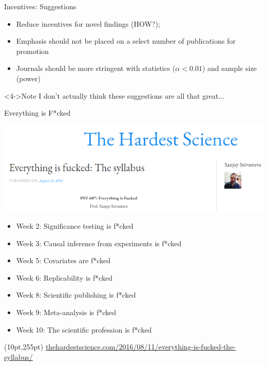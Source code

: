 \documentclass{beamer}
\begin{document}
\begin{frame}{Incentives: Suggestions}
	\begin{itemize}
		\item<1-> Reduce incentives for novel findings (HOW?); 
		\item<2-> Emphasis should not be placed on a select number of publications for promotion
		\item<3-> Journals should be more stringent with statistics ($\alpha < 0.01$) and sample size (power)
	\end{itemize}

	\begin{alertblock}<4->{Note}
		I don't actually think these suggestions are all that great...
	\end{alertblock}
\end{frame}

\begin{frame}{Everything is F*cked}
	

	\begin{center}
	\includegraphics[width=.7\textwidth]{../images/everything.png}
	\end{center}
	\begin{itemize}
		\item<2-> Week 2: Significance testing is f*cked
		\item<2-> Week 3: Causal inference from experiments is f*cked
		\item<2-> Week 5: Covariates are f*cked
		\item<2-> Week 6: Replicability is f*cked
		\item<2-> Week 8: Scientific publishing is f*cked
		\item<2-> Week 9: Meta-analysis is f*cked
		\item<2-> Week 10: The scientific profession is f*cked
	\end{itemize}

	\begin{textblock*}{300pt}(10pt,255pt)
		\tiny{\url{thehardestscience.com/2016/08/11/everything-is-fucked-the-syllabus/}}

	\end{textblock*}
\end{frame}
\end{document}
